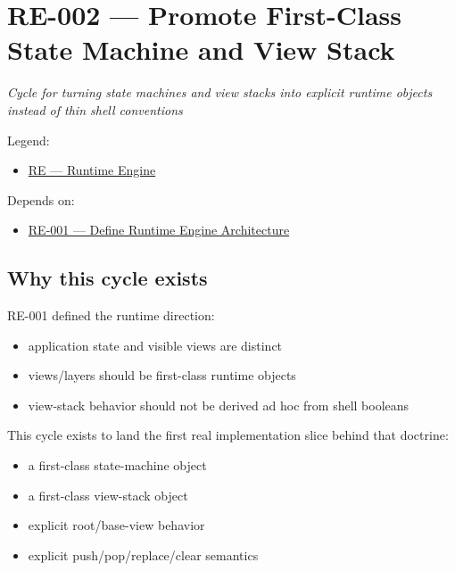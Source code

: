 \chapter{RE-002 --- Promote First-Class State Machine and View Stack}\label{record-150}

\smallskip

\emph{Cycle for turning state machines and view stacks into explicit runtime objects instead of thin shell conventions}

Legend:

\begin{itemize}
\tightlist
\item
  \href{https://github.com/flyingrobots/bijou/blob/1853ad902f6bf219326409e7f743a5a1d6517dbc/docs/legends/RE-runtime-engine.md}{RE --- Runtime Engine}
\end{itemize}

Depends on:

\begin{itemize}
\tightlist
\item
  \href{https://github.com/flyingrobots/bijou/blob/cbd70612140e7a450d764b3c7be1c6af878b99bc/docs/design/RE-001-define-runtime-engine-architecture.md}{RE-001 --- Define Runtime Engine Architecture}
\end{itemize}

\section{Why this cycle exists}\label{record-150-why-this-cycle-exists}

RE-001 defined the runtime direction:

\begin{itemize}
\tightlist
\item
  application state and visible views are distinct
\item
  views/layers should be first-class runtime objects
\item
  view-stack behavior should not be derived ad hoc from shell booleans
\end{itemize}

This cycle exists to land the first real implementation slice behind that doctrine:

\begin{itemize}
\tightlist
\item
  a first-class state-machine object
\item
  a first-class view-stack object
\item
  explicit root/base-view behavior
\item
  explicit push/pop/replace/clear semantics
\end{itemize}

